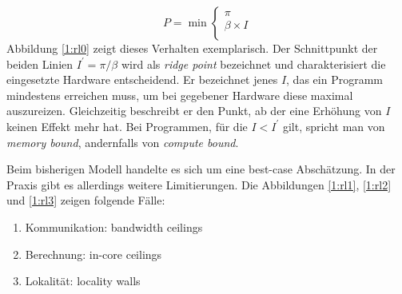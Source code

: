 		\begin{equation}
			P = \min \left\{ \begin{array}{ll} \pi \\
			\beta\times I \\ \end{array}\right.
		\end{equation}
		Abbildung \ref{1:rl0} zeigt dieses Verhalten exemplarisch. Der Schnittpunkt der beiden Linien $I^{\prime} = \pi/\beta$ wird als \textit{ridge point} bezeichnet und charakterisiert die eingesetzte Hardware entscheidend. Er bezeichnet jenes $I$, das ein Programm mindestens erreichen muss, um bei gegebener Hardware diese maximal auszureizen. Gleichzeitig beschreibt er den Punkt, ab der eine Erhöhung von $I$ keinen Effekt mehr hat. Bei Programmen, für die $I < I^{\prime}$ gilt, spricht man von \textit{memory bound}, andernfalls von \textit{compute bound}.
		
		Beim bisherigen Modell handelte es sich um eine best-case Abschätzung. In der Praxis gibt es allerdings weitere Limitierungen. Die Abbildungen \ref{1:rl1}, \ref{1:rl2} und \ref{1:rl3} zeigen folgende Fälle:
		
		\begin{enumerate}		
		\item Kommunikation: bandwidth ceilings
		\item Berechnung: in-core ceilings
		\item Lokalität: locality walls
		\end{enumerate}	